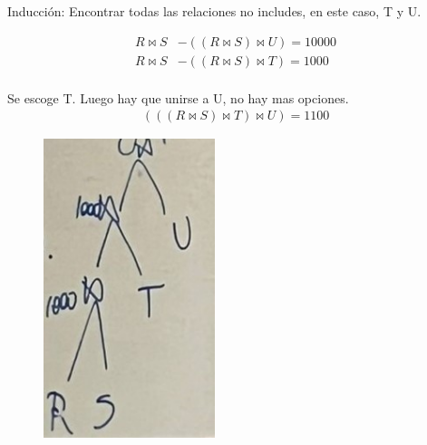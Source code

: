 \documentclass{templateNote}
\begin{document}
\begin{enumerate}
\begin{enumerate}[label=\alph*)]
            \vspace{0.5cm}
            \noindent Inducción: Encontrar todas las relaciones no includes, en este caso, T y U.

            \begin{align*}
                R \Join S &- ((R \Join S) \Join U) = 10000 \\
                R \Join S &- ((R \Join S) \Join T) = 1000 \\
            \end{align*}
            
            Se escoge T. Luego hay que unirse a U, no hay mas opciones.
            \begin{align*}
                (((R \Join S)\Join T)\Join U) = 1100
            \end{align*}

            \begin{figure}[H]
                \centering
                \includegraphics[width=5cm]{img/Imagen de WhatsApp 2024-07-08 a las 15.29.34_080aad61.jpg}
            \end{figure}

        \end{enumerate}

\end{enumerate}
\end{document}
